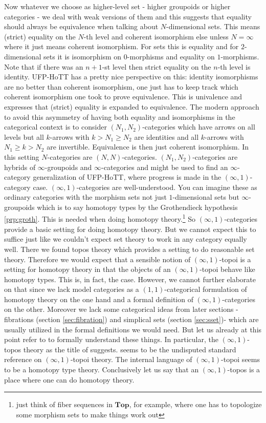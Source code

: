 Now whatever we choose as higher-level set - higher groupoids or higher categories - we deal with weak versions of them and this suggests that equality should always be equivalence when talking about $N$-dimensional sets. This means (strict) equality on the $N$-th level and coherent isomorphism else unless $N = \infty$ where it just means coherent isomorphism. For sets this is equality and for $2$-dimensional sets it is isomorphism on $0$-morphisms and equality on $1$-morphisms. Note that if there was an $n+1$-st level then strict equality on the $n$-th level is identity. UFP-HoTT has a pretty nice perspective on this: identity isomorphisms are no better than coherent isomorphism, one just has to keep track which coherent isomorphism one took to prove equivalence. This is univalence and expresses that (strict) equality is expanded to equivalence. The modern approach to avoid this asymmetry of having both equality and isomorphisms in the categorical context is to consider $(N_{1},N_{2})$-categories which have arrows on all levels but all $k$-arrows with $k > N_{1} \geq N_{2}$ are identities and all $k$-arrows with $N_{1} \geq k > N_{2}$ are invertible. Equivalence is then just coherent isomorphism. In this setting $N$-categories are $(N,N)$-categories. $(N_{1},N_{2})$-categories are hybrids of $\infty$-groupoids and $\infty$-categories and might be used to find an $\infty$-category generalization of UFP-HoTT, where progress is made in the $(\infty,1)$-category case. $(\infty,1)$-categories are well-understood. You can imagine these as ordinary categories with the morphism sets not just $1$-dimensional sets but $\infty$-groupoids which is to say homotopy types by the Grothendieck hypothesis \ref{prp:groth}. This is needed when doing homotopy theory.\footnote{just think of fiber sequences in $\mathbf{Top}$, for example, where one has to topologize some morphism sets to make things work out} So $(\infty,1)$-categories provide a basic setting for doing homotopy theory. But we cannot expect this to suffice just like we couldn't expect set theory to work in any category equally well. There we found topos theory which provides a setting to do reasonable set theory. Therefore we would expect that a sensible notion of $(\infty,1)$-topoi is a setting for homotopy theory in that the objects of an $(\infty,1)$-topoi behave like homotopy types. This is, in fact, the case. However, we cannot further elaborate on that since we lack model categories as a $(1,1)$-categorical formulation of homotopy theory on the one hand and a formal definition of $(\infty,1)$-categories on the other. Moreover we lack some categorical ideas from later sections - fibrations (section \ref{sec:fibration}) and simplical sets (section \ref{sec:sset})- which are usually utilized in the formal definitions we would need. But let us already at this point refer to \cite{0349e8ea} to formally understand these things. In particular, the $(\infty,1)$-topos theory as the title of \cite{0349e8ea} suggests. \cite{0349e8ea} seems to be the undisputed standard reference on $(\infty,1)$-topoi theory. The internal language of $(\infty,1)$-topoi seems to be a homotopy type theory. Conclusively let us say that an $(\infty,1)$-topos is a place where one can do homotopy theory.
